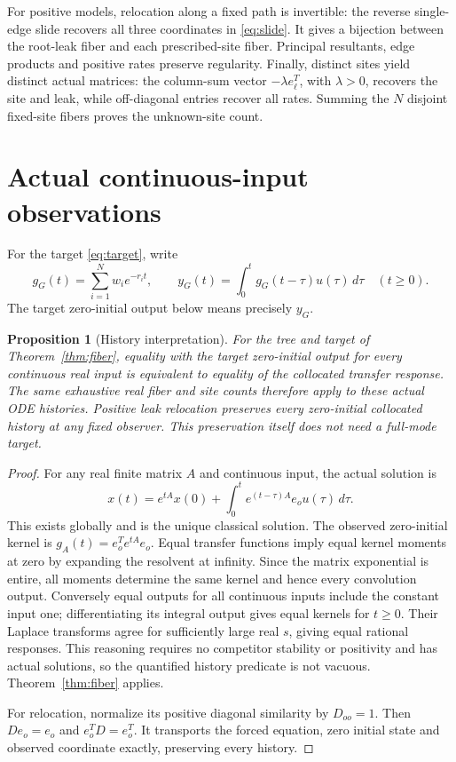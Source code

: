 \documentclass[11pt]{article}
\newtheorem{proposition}[theorem]{Proposition}
\theoremstyle{remark}
\newcommand{\1}{\mathbf 1}
\begin{document}
For positive models, relocation along a fixed path is invertible: the reverse
single-edge slide recovers all three coordinates in \eqref{eq:slide}.
It gives a bijection between the root-leak fiber and each prescribed-site
fiber. Principal resultants, edge products and positive rates preserve
regularity. Finally, distinct sites yield distinct actual matrices: the
column-sum vector $-\lambda e_\ell^T$, with $\lambda>0$, recovers the site
and leak, while off-diagonal entries recover all rates. Summing the $N$
disjoint fixed-site fibers proves the unknown-site count.

\section{Actual continuous-input observations}
For the target \eqref{eq:target}, write
\[
 g_G(t)=\sum_{i=1}^N w_i e^{-r_i t},\qquad
 y_G(t)=\int_0^t g_G(t-\tau)u(\tau)\,d\tau\quad(t\ge0).
\]
The target zero-initial output below means precisely $y_G$.
\begin{proposition}[History interpretation]\label{prop:history}
For the tree and target of Theorem~\ref{thm:fiber}, equality with the target
zero-initial output for every continuous real input is equivalent to
equality of the collocated transfer response. The same exhaustive real
fiber and site counts therefore apply to these actual ODE histories.
Positive leak relocation preserves every zero-initial collocated history
at any fixed observer. This preservation itself does not need a full-mode
target.
\end{proposition}
\begin{proof}
For any real finite matrix $A$ and continuous input, the actual solution is
\[
 x(t)=e^{tA}x(0)+\int_0^t e^{(t-\tau)A}e_o u(\tau)\,d\tau.
\]
This exists globally and is the unique classical solution. The observed
zero-initial kernel is $g_A(t)=e_o^Te^{tA}e_o$.
Equal transfer functions imply equal kernel moments at zero by expanding
the resolvent at infinity. Since the matrix exponential is entire, all
moments determine the same kernel and hence every convolution output.
Conversely equal outputs for all continuous inputs include the constant
input one; differentiating its integral output gives equal kernels for
$t\ge0$. Their Laplace transforms agree for sufficiently large real $s$,
giving equal rational responses. This reasoning requires no competitor
stability or positivity and has actual solutions, so the quantified history
predicate is not vacuous. Theorem~\ref{thm:fiber} applies.

For relocation, normalize its positive diagonal similarity by $D_{oo}=1$.
Then $D e_o=e_o$ and $e_o^TD=e_o^T$. It transports the forced equation,
zero initial state and observed coordinate exactly, preserving every history.
\end{proof}
\end{document}
